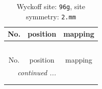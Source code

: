 \documentclass[fleqn,8pt]{jsarticle}
\begin{document}
\renewcommand{\arraystretch}{1.2}
\begin{longtable}{ccc}
\caption{Wyckoff site: {\tt 96g}, site symmetry: {\tt 2.mm}}
 \\
 \hline \hline
No. & position & mapping \\ \hline \endfirsthead

\multicolumn{2}{l}{\tablename\ \thetable{}} \\
 \hline \hline
No. & position & mapping \\ \hline \endhead

 \hline \hline
\multicolumn{2}{r}{\footnotesize\it continued ...} \\ \endfoot

 \hline \hline
\multicolumn{2}{r}{} \\ \endlastfoot


\end{longtable}
\end{document}
